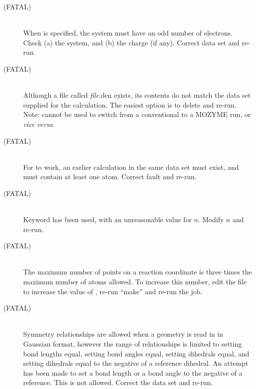 \begin{description}
\item[ (FATAL)]~\\
When  is specified, the system must have an odd number of
electrons.  Check (a) the system, and (b) the charge (if any).  Correct
data set and re-run.

\item[ (FATAL)]~\\
Although a file called \emph{file}.den exists, its contents do not match the data
set supplied for the calculation.  The easiest option is to delete 
and re-run.  Note:  cannot be used to switch from a conventional to a
MOZYME run, or {\em vice versa}.

\item[ (FATAL)]~\\
For  to work, an earlier calculation in the same data set must exist,
and must contain at least one atom.  Correct fault and re-run.

\item[ (FATAL)]~\\
Keyword  has been used, with an unreasonable value for $n$.
Modify $n$ and re-run.

\item[ (FATAL)]~\\
The maximum number of points on a reaction coordinate is three times the maximum
number of atoms allowed.  To increase this number, edit the file  
to increase the value of , re-run ``make'' and re-run the job.

\item[ (FATAL)]~\\
Symmetry relationships are allowed when a geometry is read in in Gaussian format, 
however the range of relationships is limited to setting bond lengths equal,
setting bond angles equal, setting dihedrals equal, and setting dihedrals
equal to the negative of a reference dihedral.  An attempt has been made to set
a bond length or a bond angle to the negative of a reference.  This is not
allowed.  Correct the data set and re-run.


\end{description}
